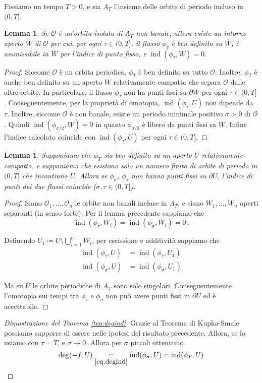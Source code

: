 \documentclass[a4paper, 11pt]{article}
\theoremstyle{definition}
\theoremstyle{plain}
\newtheorem{Lemma}[Def]{Lemma}
\newcommand{\OO}{\mathcal{O}}
\newcommand{\cl}[1]{\overline{#1}}
\newcommand{\deff}{\coloneqq}
\DeclareMathOperator{\ind}{ind}
\begin{document}
Fissiamo un tempo $T > 0$, e sia $A_T$ l'insieme delle orbite di periodo incluso in $(0,T]$.
\begin{Lemma}
	Se $\OO$ è un'orbita isolata di $A_T$ non banale, allora esiste un intorno aperto $W$ di $\OO$ per cui, per ogni $\tau \in (0,T]$, il flusso $\phi_\tau$ è ben definito su $\cl{W}$, è ammissibile in $W$ per l'indice di punto fisso, e $\ind(\phi_\tau,W) = 0$.
\end{Lemma}
\begin{proof}
	Siccome $\OO$ è un orbita periodica, $\phi_T$ è ben definito su tutto $\OO$. Inoltre, $\phi_T$ è anche ben definita su un aperto $W$ relativamente compatto che separa $\OO$ dalle altre orbite. In particolare, il flusso $\phi_\tau$ non ha punti fissi su $\partial W$ per ogni $\tau \in (0,T]$. Conseguentemente, per la proprietà di omotopia, $\ind(\phi_\tau,U)$ non dipende da $\tau$. Inoltre, siccome $\OO$ è non banale, esiste un periodo minimale positivo $\sigma > 0$ di $\OO$. Quindi $\ind(\phi_{\sigma/2}, W) = 0$ in quanto $\phi_{\sigma/2}$ è libero da punti fissi sa $\overline{W}$. Infine l'indice calcolato coincide con $\ind(\phi_\tau,U)$ per ogni $\tau \in (0,T]$.
\end{proof}
\begin{Lemma}
	Supponiamo che $\phi_T$ sia ben definito su un aperto $U$ relativamente compatto, e supponiamo che esistono solo un numero finito di orbite di periodo in $(0,T]$ che incontrano $\cl{U}$. Allora se $ \phi_\sigma$, $\phi_\tau$ non hanno punti fissi su $\partial U$, l'indice di punti dei due flussi coincide ($\sigma, \tau \in (0,T]$).
\end{Lemma}
\begin{proof}
	Siano $\OO_1, \dots, \OO_n$ le orbite non banali incluse in $A_T$, e siano $W_1, \dots, W_n$ aperti separanti (in senso forte). Per il lemma precedente sappiamo che 
	\[
		\ind(\phi_\tau, W_i) = \ind(\phi_\sigma, W_i) = 0\,.
	\]
	
	Definendo $U_1 \deff U \setminus \bigcup_{i= 1}^n \cl{W_i}$, per escissione e additività  sappiamo che 
	\[
	\begin{split}
		\ind(\phi_\tau, U) &= \ind(\phi_\tau, U_1)\\
		\ind(\phi_\sigma, U) &= \ind(\phi_\sigma, U_1)
	\end{split}
	\]
	
	Ma su $\cl{U}$ le orbite periodiche di $A_T$ sono solo singolari. Conseguentemente l'omotopia sui tempi tra $\phi_\tau$ e $\phi_\sigma$ non può avere punti fissi in $\partial U$ ed è accettabile.
\end{proof}
\begin{proof}[Dimostrazione del Teorema \ref{teo:degind}]
	Grazie al Teorema di Kupka-Smale possiamo supporre di essere nelle ipotesi del risultato precedente. Allora, se lo usiamo con $\tau = T$, e $\sigma \to 0$. Allora per $\sigma$ piccoli otteniamo
	\[
		\deg(-f, U) \underset{\eqref{eq:degind}}{=} \ind(\phi_\sigma, U) = \ind(\phi_T, U)\qedhere
	\]
\end{proof}
\end{document}
